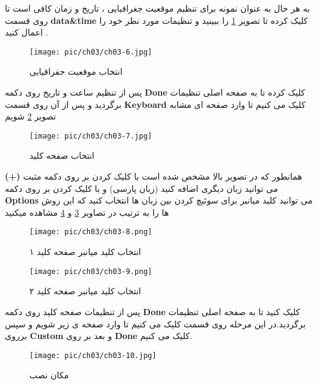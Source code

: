به هر حال به عنوان نمونه برای تنظیم موقعیت جغرافیایی ، تاریخ و زمان کافی است تا روی قسمت  
\textbf{data\&time}
کلیک کرده تا تصویر
\ref{pic-6}
   را ببینید و تنظیمات مورد نظر خود را اعمال کنید .
\begin{figure}[H]%
	\caption{ انتخاب موقعیت جفراقیایی }
	\begin{center}
		\texttt{[image: pic/ch03/ch03-6.jpg]}
	\end{center}
	\label{pic-6}
\end{figure}
پس از تنظیم ساعت و تاریخ روی دکمه 
\textbf{Done}
 کلیک کرده تا به صفحه اصلی تنظیمات برگردید و پس از آن روی قسمت 
 \textbf{Keyboard}
  کلیک می کنیم تا وارد صفحه ای مشابه تصویر
  \ref{pic-7}
 شویم
  \begin{figure}[H]%
  	\caption{ انتخاب صفحه کلید }
  	\begin{center}
  		\texttt{[image: pic/ch03/ch03-7.jpg]}
  	\end{center}
  	\label{pic-7}
  \end{figure}
همانطور که در تصویر بالا مشخص شده است 
با کلیک کردن بر روی دکمه مثبت 
\textbf{(+)} 
می توانید زبان دیگری اضافه کنید (زبان پارسی)  و با کلیک کردن بر روی دکمه  \textbf{Options}
می توانید کلید میانبر برای سوئیچ کردن بین زبان ها انتخاب کنید که این روش ها را به ترتیب در تصاویر 
\ref{pic-8}
و
\ref{pic-9}
مشاهده میکنید
  \begin{figure}[H]%
	\caption{ انتخاب کلید میانبر صفحه کلید ۱}
	\begin{center}
		\texttt{[image: pic/ch03/ch03-8.png]}
	\end{center}
	\label{pic-8}
\end{figure}
  \begin{figure}[H]%
	\caption{ انتخاب کلید میانبر صفحه کلید ۲}
	\begin{center}
		\texttt{[image: pic/ch03/ch03-9.png]}
	\end{center}
	\label{pic-9}
\end{figure}
پس از تنظیمات صفحه کلید روی دکمه  \textbf{Done} کلیک کنید تا به صفحه اصلی تنظیمات برگردید.در این  مرحله روی قسمت
کلیک می کنیم تا وارد صفحه ی زیر شویم و سپس برروی
 \textbf{Custom} 
 و بعد بر روی 
 \textbf{Done} 
 کلیک می کنیم.
 \begin{figure}[H]%
	\caption{ مکان نصب}
	\begin{center}
		\texttt{[image: pic/ch03/ch03-10.jpg]}
	\end{center}
	\label{pic-10}
\end{figure}
